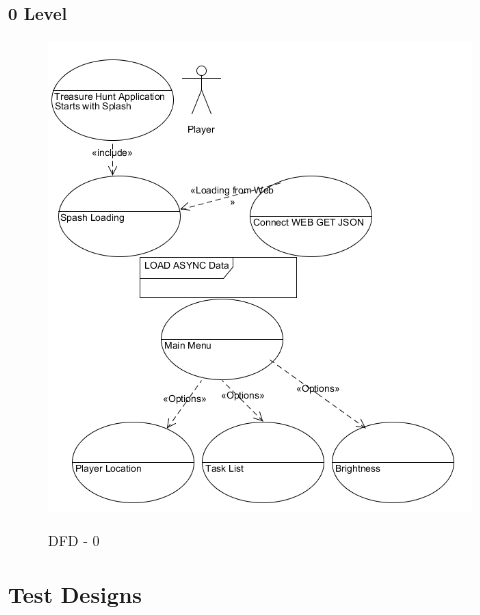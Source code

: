 \subsubsection{0 Level}

\begin{figure} [ht]
\centering
\includegraphics[scale=0.5]{dfd0}\\
\caption{DFD - 0 }
\label{the-label-for-cross-referencing}
\end{figure}



\subsection{Test Designs }